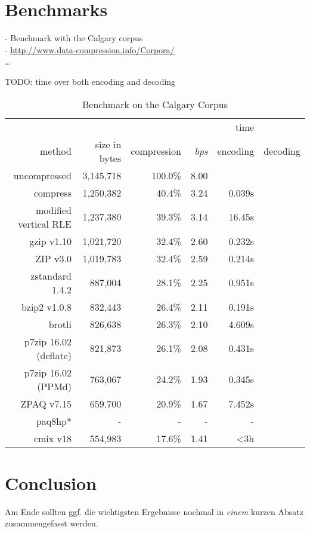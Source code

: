 \section{Benchmarks}
\label{ch:Evaluation:sec:Benchmarks}
- Benchmark with the Calgary corpus\\
- \url{http://www.data-compression.info/Corpora/} \\
\ldots
\par{
TODO: time over both encoding and decoding
}
	\begin{table}[h]
	\begin{tabular}{r|r|r|r|r|r}
		 & & & & time\\
		method  &  size in bytes & compression & \textit{bps}& encoding & decoding\\
		\hline
		uncompressed & 3,145,718 & 100.0\% & 8.00 &\\
		compress & 1,250,382 & 40.4\% & 3.24 & 0.039s\\
		modified vertical RLE & 1,237,380 & 39.3\%& 3.14 & 16.45s\\
		gzip v1.10 & 1,021,720 & 32.4\% & 2.60 & 0.232s\\
		ZIP v3.0 & 1,019,783 & 32.4\% & 2.59 & 0.214s\\
		zstandard 1.4.2& 887,004 & 28.1\% & 2.25 & 0.951s\\
		bzip2 v1.0.8 & 832,443 & 26.4\% & 2.11 & 0.191s\\
		brotli & 826,638 & 26.3\%& 2.10 & 4.609s\\
		p7zip 16.02 (deflate) &  821,873 & 26.1\% & 2.08 & 0.431s \\
		p7zip 16.02 (PPMd) &  763,067& 24.2\% & 1.93 & 0.345s\\
		ZPAQ v7.15 & 659.700 & 20.9\% & 1.67 & 7.452s \\
		paq8hp* & - & - & - & - \\ 
		cmix v18 & 554,983 & 17.6\% & 1.41 & <3h		
	\end{tabular}
	\label{tab:t100benchmark}
	\caption{Benchmark on the Calgary Corpus}
\end{table}
\section{Conclusion}
\label{ch:Evaluation:sec:Conclusion}

Am Ende sollten ggf. die wichtigsten Ergebnisse nochmal in \emph{einem} kurzen Absatz zusammengefasst werden.

